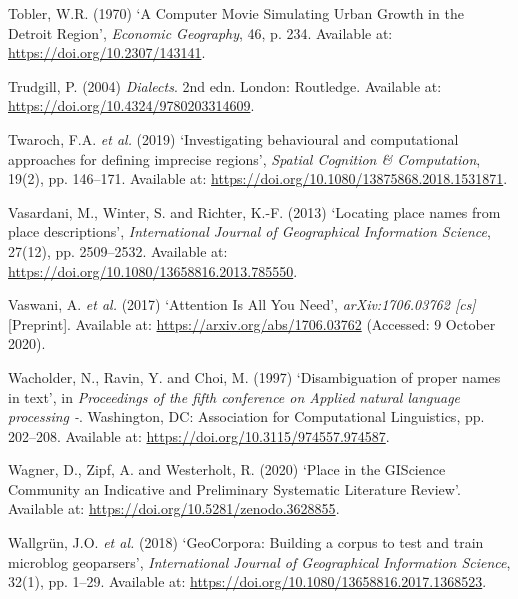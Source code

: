 \documentclass[
  letterpaper,
  11pt,
  english,
  onehalfspacing,
  headsepline]{MastersDoctoralThesis}
\newlength{\cslhangindent}
\newlength{\cslentryspacingunit} %
\newenvironment{CSLReferences}[2] %
 {%
  \setlength{\parindent}{0pt}
  \ifodd #1
  \let\oldpar\par
  \def\par{\hangindent=\cslhangindent\oldpar}
  \fi
  \setlength{\parskip}{#2\cslentryspacingunit}
 }%
 {}
\begin{document}
\begin{CSLReferences}{0}{0}
\leavevmode{}%
Tobler, W.R. (1970) {`A {Computer Movie Simulating Urban Growth} in the
{Detroit Region}'}, \emph{Economic Geography}, 46, p. 234. Available at:
\url{https://doi.org/10.2307/143141}.

\leavevmode{}%
Trudgill, P. (2004) \emph{Dialects}. 2nd edn. {London}: {Routledge}.
Available at: \url{https://doi.org/10.4324/9780203314609}.

\leavevmode{}%
Twaroch, F.A. \emph{et al.} (2019) {`Investigating behavioural and
computational approaches for defining imprecise regions'}, \emph{Spatial
Cognition \& Computation}, 19(2), pp. 146--171. Available at:
\url{https://doi.org/10.1080/13875868.2018.1531871}.

\leavevmode{}%
Vasardani, M., Winter, S. and Richter, K.-F. (2013) {`Locating place
names from place descriptions'}, \emph{International Journal of
Geographical Information Science}, 27(12), pp. 2509--2532. Available at:
\url{https://doi.org/10.1080/13658816.2013.785550}.

\leavevmode{}%
Vaswani, A. \emph{et al.} (2017) {`Attention {Is All You Need}'},
\emph{arXiv:1706.03762 {[}cs{]}} {[}Preprint{]}. Available at:
\url{https://arxiv.org/abs/1706.03762} (Accessed: 9 October 2020).

\leavevmode{}%
Wacholder, N., Ravin, Y. and Choi, M. (1997) {`Disambiguation of proper
names in text'}, in \emph{Proceedings of the fifth conference on
{Applied} natural language processing -}. {Washington, DC}: {Association
for Computational Linguistics}, pp. 202--208. Available at:
\url{https://doi.org/10.3115/974557.974587}.

\leavevmode{}%
Wagner, D., Zipf, A. and Westerholt, R. (2020) {`Place in the {GIScience
Community} {\textendash} an {Indicative} and {Preliminary Systematic
Literature Review}'}. Available at:
\url{https://doi.org/10.5281/zenodo.3628855}.

\leavevmode{}%
Wallgrün, J.O. \emph{et al.} (2018) {`{GeoCorpora}: Building a corpus to
test and train microblog geoparsers'}, \emph{International Journal of
Geographical Information Science}, 32(1), pp. 1--29. Available at:
\url{https://doi.org/10.1080/13658816.2017.1368523}.


\end{CSLReferences}
\end{document}

